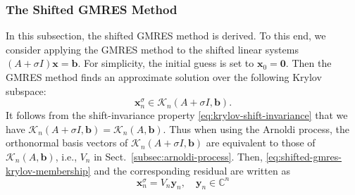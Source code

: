 \subsubsection{{The Shifted GMRES Method}}\label{subsec:shifted-gmres}
{In this subsection, the shifted GMRES method  is derived. To this end, we consider applying the GMRES method to the shifted linear systems $(A+\sigma I)\bm x=\bm b$. For simplicity, the initial guess is set to $\bm x_0=\bm0$. Then the GMRES method finds an approximate solution over the following Krylov subspace:}
\begin{equation}\label{eq:shifted-gmres-krylov-membership}\bm x_n^{\sigma}\in\mathcal K_n(A+\sigma I,\bm b).\end{equation}
{It follows from the shift-invariance property \eqref{eq:krylov-shift-invariance} that we have $\mathcal K_n(A+\sigma I,\bm b)=\mathcal K_n(A,\bm b)$. Thus when using the Arnoldi process, the orthonormal basis vectors of $\mathcal K_n(A+\sigma I,\bm b)$ are equivalent to those of $\mathcal K_n(A,\bm b)$, i.e., $V_n$ in Sect.\ \ref{subsec:arnoldi-process}. Then, \eqref{eq:shifted-gmres-krylov-membership} and the corresponding residual are written as}
\[\bm x_n^{\sigma}=V_n\bm y_n,\quad\bm y_n\in\mathbb C^n\]
